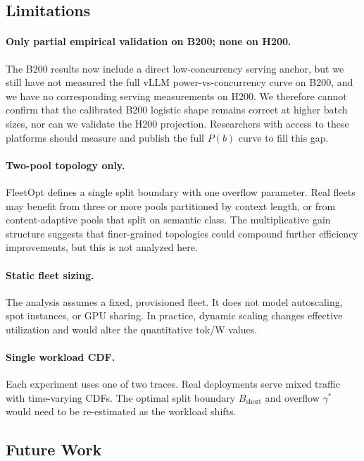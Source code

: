 \documentclass[11pt,a4paper]{article}
\begin{document}
\subsection{Limitations}

\paragraph{Only partial empirical validation on B200; none on H200.}
The B200 results now include a direct low-concurrency serving anchor, but we
still have not measured the full vLLM power-vs-concurrency curve on B200, and
we have no corresponding serving measurements on H200.  We therefore cannot
confirm that the calibrated B200 logistic shape remains correct at higher batch
sizes, nor can we validate the H200 projection.  Researchers with access to
these platforms should measure and publish the full $P(b)$ curve to fill this gap.

\paragraph{Two-pool topology only.}
FleetOpt defines a single split boundary with one overflow parameter.  Real
fleets may benefit from three or more pools partitioned by context length,
or from content-adaptive pools that split on semantic class.  The
multiplicative gain structure suggests that finer-grained topologies could
compound further efficiency improvements, but this is not analyzed here.

\paragraph{Static fleet sizing.}
The analysis assumes a fixed, provisioned fleet.  It does not model
autoscaling, spot instances, or GPU sharing.  In practice, dynamic scaling
changes effective utilization and would alter the quantitative tok/W values.

\paragraph{Single workload CDF.}
Each experiment uses one of two traces.  Real deployments serve mixed traffic
with time-varying CDFs.  The optimal split boundary $B_{\text{short}}$ and
overflow $\gamma^*$ would need to be re-estimated as the workload shifts.

\subsection{Future Work}
\end{document}
